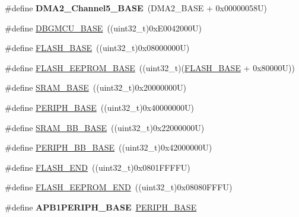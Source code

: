 \begin{DoxyCompactItemize}
\item 
\hypertarget{group___peripheral__memory__map_ga1eea983a5d68bf36f4d19fbb07955ca1}{\#define {\bfseries D\-M\-A2\-\_\-\-Channel5\-\_\-\-B\-A\-S\-E}~(D\-M\-A2\-\_\-\-B\-A\-S\-E + 0x00000058\-U)}\label{group___peripheral__memory__map_ga1eea983a5d68bf36f4d19fbb07955ca1}

\item 
\#define \hyperlink{group___peripheral__memory__map_ga4adaf4fd82ccc3a538f1f27a70cdbbef}{D\-B\-G\-M\-C\-U\-\_\-\-B\-A\-S\-E}~((uint32\-\_\-t)0x\-E0042000\-U)
\item 
\#define \hyperlink{group___peripheral__memory__map_ga23a9099a5f8fc9c6e253c0eecb2be8db}{F\-L\-A\-S\-H\-\_\-\-B\-A\-S\-E}~((uint32\-\_\-t)0x08000000\-U)
\item 
\#define \hyperlink{group___peripheral__memory__map_ga45b9071c81cb72a66e2e3195343fcb3a}{F\-L\-A\-S\-H\-\_\-\-E\-E\-P\-R\-O\-M\-\_\-\-B\-A\-S\-E}~((uint32\-\_\-t)(\hyperlink{group___peripheral__memory__map_ga23a9099a5f8fc9c6e253c0eecb2be8db}{F\-L\-A\-S\-H\-\_\-\-B\-A\-S\-E} + 0x80000\-U))
\item 
\#define \hyperlink{group___peripheral__memory__map_ga05e8f3d2e5868754a7cd88614955aecc}{S\-R\-A\-M\-\_\-\-B\-A\-S\-E}~((uint32\-\_\-t)0x20000000\-U)
\item 
\#define \hyperlink{group___peripheral__memory__map_ga9171f49478fa86d932f89e78e73b88b0}{P\-E\-R\-I\-P\-H\-\_\-\-B\-A\-S\-E}~((uint32\-\_\-t)0x40000000\-U)
\item 
\#define \hyperlink{group___peripheral__memory__map_gad3548b6e2f017f39d399358f3ac98454}{S\-R\-A\-M\-\_\-\-B\-B\-\_\-\-B\-A\-S\-E}~((uint32\-\_\-t)0x22000000\-U)
\item 
\#define \hyperlink{group___peripheral__memory__map_gaed7efc100877000845c236ccdc9e144a}{P\-E\-R\-I\-P\-H\-\_\-\-B\-B\-\_\-\-B\-A\-S\-E}~((uint32\-\_\-t)0x42000000\-U)
\item 
\#define \hyperlink{group___peripheral__memory__map_ga8be554f354e5aa65370f6db63d4f3ee4}{F\-L\-A\-S\-H\-\_\-\-E\-N\-D}~((uint32\-\_\-t)0x0801\-F\-F\-F\-F\-U)
\item 
\#define \hyperlink{group___peripheral__memory__map_gac8cb9b66893a7c4bdff3258909af027a}{F\-L\-A\-S\-H\-\_\-\-E\-E\-P\-R\-O\-M\-\_\-\-E\-N\-D}~((uint32\-\_\-t)0x08080\-F\-F\-F\-U)
\item 
\hypertarget{group___peripheral__memory__map_ga45666d911f39addd4c8c0a0ac3388cfb}{\#define {\bfseries A\-P\-B1\-P\-E\-R\-I\-P\-H\-\_\-\-B\-A\-S\-E}~\hyperlink{group___peripheral__memory__map_ga9171f49478fa86d932f89e78e73b88b0}{P\-E\-R\-I\-P\-H\-\_\-\-B\-A\-S\-E}}\label{group___peripheral__memory__map_ga45666d911f39addd4c8c0a0ac3388cfb}


\end{DoxyCompactItemize}
